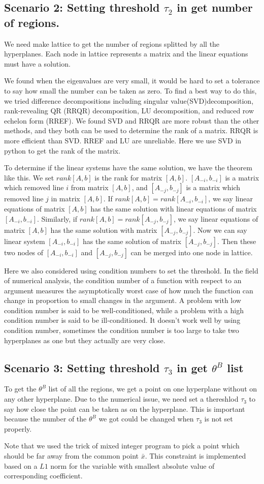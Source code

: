 \documentclass[11pt]{amsart}
\begin{document}
\subsection{Scenario 2: Setting threshold $\tau_2$ in get number of regions.}
We need make lattice to get the number of regions splitted by all the hyperplanes.
Each node in lattice represents a matrix and the linear equations must have a solution.

We found when the eigenvalues are very small, it would be hard to set a tolerance to say how small the number can be taken as zero.
To find a best way to do this, we tried difference decompositions including singular value(SVD)decomposition,
rank-revealing QR (RRQR) decomposition, LU decomposition, and reduced row echelon form (RREF).
We found SVD and RRQR are more robust than the other methods, and they both can be used to determine the rank of a matrix.
RRQR is more efficient than SVD. RREF and LU are unreliable.
Here we use SVD in python to get the rank of the matrix.

To determine if the linear systems have the same solution, we have the theorem like this. We set $rank[A, b]$ is the rank for matrix $[A, b]$.
$[A_{-i}, b_{-i}]$ is a matrix which removed line $i$ from matrix $[A, b]$, and $[A_{-j},b_{-j}]$ is a matrix which removed line $j$ in matrix $[A, b]$.
If $rank[A, b]=rank[A_{-i}, b_{-i}]$, we say linear equations of matrix $[A, b]$ has the same solution with linear equations of matrix $[A_{-i}, b_{-i}]$.
Similarly, if $rank[A, b]=rank[A_{-j}, b_{-j}]$, we say linear equations of matrix $[A, b]$ has the same solution with matrix $[A_{-j}, b_{-j}]$.
Now we can say linear system $[A_{-i}, b_{-i}]$ has the same solution of matrix $[A_{-j}, b_{-j}]$.
Then these two nodes of $[A_{-i}, b_{-i}]$ and $[A_{-j}, b_{-j}]$ can be merged into one node in lattice.

Here we also considered using condition numbers to set the threshold.
In the field of numerical analysis, the condition number of a function with respect to an argument measures the asymptotically worst case of how much the function can change in proportion to small changes in the argument.
A problem with low condition number is said to be well-conditioned, while a problem with a high condition number is said to be ill-conditioned.
It doesn't work well by using condition number, sometimes the condition number is too large to take two hyperplanes as one but they actually are very close.

\subsection{Scenario 3: Setting threshold $\tau_3$ in get $\theta^B$ list}
To get the $\theta^B$ list of all the regions, we get a point on one hyperplane without on any other hyperplane.
Due to the numerical issue, we need set a thereshlod $\tau_3$ to say how close the point can be taken as on the hyperplane.
This is important because the number of the $\theta^B$ we got could be changed when $\tau_3$ is not set properly.

Note that we used the trick of mixed integer program to pick a point which should be far away from the common point $\bar{x}$.
This constraint is implemented based on a $L 1$ norm for the variable with smallest absolute value of corresponding coefficient.
\end{document}
